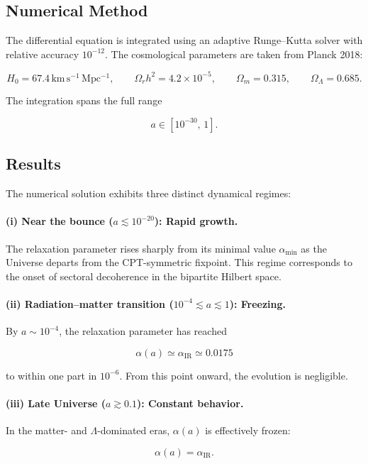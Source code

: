 \documentclass[11pt,a4paper]{article}
\begin{document}
\subsection{Numerical Method}

The differential equation is integrated using an adaptive Runge–Kutta solver with relative
accuracy $10^{-12}$. The cosmological parameters are taken from Planck 2018:


\[
    H_0 = 67.4\,\mathrm{km\,s^{-1}\,Mpc^{-1}},\qquad
    \Omega_r h^2 = 4.2\times 10^{-5},\qquad
    \Omega_m = 0.315,\qquad
    \Omega_\Lambda = 0.685.
\]


The integration spans the full range


\[
    a \in [10^{-30},\,1].
\]



\subsection{Results}

The numerical solution exhibits three distinct dynamical regimes:

\paragraph{(i) Near the bounce ($a \lesssim 10^{-20}$): Rapid growth.}
The relaxation parameter rises sharply from its minimal value $\alpha_{\min}$ as the Universe
departs from the CPT-symmetric fixpoint. This regime corresponds to the onset of sectoral
decoherence in the bipartite Hilbert space.

\paragraph{(ii) Radiation–matter transition ($10^{-4} \lesssim a \lesssim 1$): Freezing.}
By $a \sim 10^{-4}$, the relaxation parameter has reached


\[
    \alpha(a) \simeq \alpha_{\mathrm{IR}} \simeq 0.0175
\]


to within one part in $10^{-6}$. From this point onward, the evolution is negligible.

\paragraph{(iii) Late Universe ($a \gtrsim 0.1$): Constant behavior.}
In the matter- and $\Lambda$-dominated eras, $\alpha(a)$ is effectively frozen:


\[
    \alpha(a) = \alpha_{\mathrm{IR}}.
\]
\end{document}
